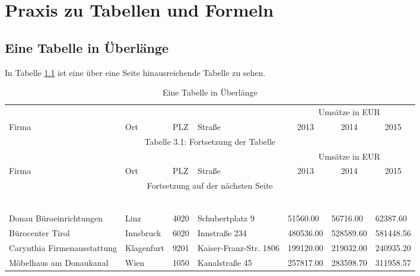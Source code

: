 \chapter[Praxisübungen]{Praxis zu Tabellen und Formeln}

\section{Eine Tabelle in Überlänge}
In Tabelle \cref{tab:1} ist eine über eine Seite hinausreichende Tabelle zu sehen. 
{\tiny %
\begin{longtable}{lllllll}
    \caption{Eine Tabelle in Überlänge} \\
  \toprule
  ~ & ~ & ~ & ~ & \multicolumn{3}{c}{Umsätze in EUR} \\
  \cline{5-7}
  Firma & Ort & PLZ & Straße & \multicolumn{1}{c}{2013} & \multicolumn{1}{c}{2014} & \multicolumn{1}{c}{2015} \\ 
  \midrule
  \endfirsthead
  \multicolumn{7}{c}{Tabelle 3.1: Fortsetzung der Tabelle} \\
  \midrule
  ~ & ~ & ~ & ~ & \multicolumn{3}{c}{Umsätze in EUR} \\
  \cline{5-7}
  Firma & Ort & PLZ & Straße & \multicolumn{1}{c}{2013} & \multicolumn{1}{c}{2014} & \multicolumn{1}{c}{2015} \\ 
  \midrule
  \endhead
  \midrule
  \multicolumn{7}{c}{Fortsetzung auf der nächsten Seite} \\
  \midrule
  \endfoot
  \midrule
  \multicolumn{7}{c}{Ende der Tabelle mit Überlänge} \\
  \bottomrule
  \endlastfoot
  \label{tab:1}
        ~ & ~ & ~ & ~ & ~ & ~ & ~ \\
        Donau Büroeinrichtungen & Linz & 4020 & Schubertplatz 9 & 51560.00 & 56716.00 & 62387.60 \\ 
        Bürocenter Tirol & Innsbruck & 6020 & Innstraße 234 & 480536.00 & 528589.60 & 581448.56 \\ 
        Carynthia Firmenausstattung & Klagenfurt & 9201 & Kaiser-Franz-Str. 1806 & 199120.00 & 219032.00 & 240935.20 \\ 
        Möbelhaus am Donaukanal & Wien & 1050 & Kanalstraße 45 & 257817.00 & 283598.70 & 311958.57 \\ 

\end{longtable}}
